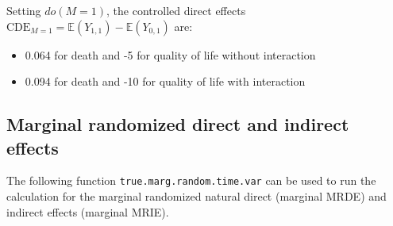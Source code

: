 \documentclass[
]{book}
\providecommand{\tightlist}{%
  \setlength{\itemsep}{0pt}\setlength{\parskip}{0pt}}
\begin{document}
Setting \(do(M=1)\), the controlled direct effects \(\text{CDE}_{M=1} = \mathbb{E}\left(Y_{1,1} \right) - \mathbb{E}\left(Y_{0,1} \right)\) are:

\begin{itemize}
\tightlist
\item
  0.064 for death and -5 for quality of life without interaction
\item
  0.094 for death and -10 for quality of life with interaction
\end{itemize}

\hypertarget{marginal-randomized-direct-and-indirect-effects-1}{%
\subsection{Marginal randomized direct and indirect effects}\label{marginal-randomized-direct-and-indirect-effects-1}}

The following function \texttt{true.marg.random.time.var} can be used to run the calculation for the marginal randomized natural direct (marginal MRDE) and indirect effects (marginal MRIE).
\end{document}
